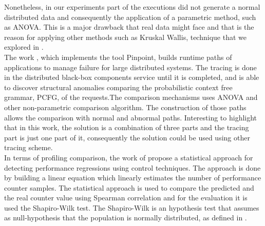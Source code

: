 Nonetheless, in our experiments part of the executions did not generate a normal distributed data and consequently the application of a parametric method, such as ANOVA. This is a major drawback that real data might face and that is the reason for applying other methods such as Kruskal Wallis, technique that we explored in \cite{KW}.\\
The work \cite{50}, which implements the tool Pinpoint, builds runtime paths of applications to manage failure for large distributed systems. The tracing is done in the distributed black-box components service until it is completed, and is able to discover structural anomalies comparing the probabilistic context free grammar, PCFG, of the requests.The comparison mechanisms uses ANOVA and other non-parametric comparison algorithm. The construction of those paths allows the comparison with normal and abnormal paths. Interesting to highlight that in this work, the solution is a combination of three parts and the tracing part is just one part of it, consequently the solution could be used using other tracing scheme.\\
In terms of profiling comparison, the work of \cite{process_control} propose a statistical approach for detecting performance regressions using control techniques. The approach is done by building a linear equation which linearly estimates the number of performance counter samples. The statistical approach is used to compare the predicted and the real counter value using Spearman correlation and for the evaluation it is used the Shapiro-Wilk test. The Shapiro-Wilk is an hypothesis test that assumes as null-hypothesis that the population is normally distributed, as defined in \cite{shapiro}.\\
